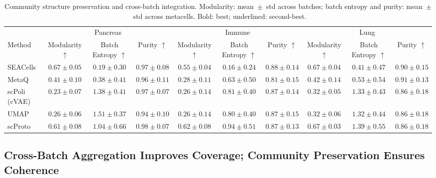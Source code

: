 \begin{table}[t]
\centering
\caption{Community structure preservation and cross-batch integration. Modularity: mean~$\pm$~std across batches; batch entropy and purity: mean~$\pm$~std across metacells. Bold: best; underlined: second-best.}
\label{tab:graph_batch}
\tiny
\setlength{\tabcolsep}{1pt}
\begin{tabular}{lccc|ccc|ccc}
\toprule
 & \multicolumn{3}{c}{Pancreas}
 & \multicolumn{3}{c}{Immune}
 & \multicolumn{3}{c}{Lung} \\
\cmidrule(lr){2-4} \cmidrule(lr){5-7} \cmidrule(lr){8-10}
Method
& Modularity $\uparrow$ & Batch Entropy $\uparrow$ & Purity $\uparrow$
& Modularity $\uparrow$ & Batch Entropy $\uparrow$ & Purity $\uparrow$
& Modularity $\uparrow$ & Batch Entropy $\uparrow$ & Purity $\uparrow$ \\
\midrule

SEACells
& $\mathbf{0.67 \pm 0.05}$ & $0.19 \pm 0.30$ & $\underline{0.97 \pm 0.08}$
& $\underline{0.55 \pm 0.04}$ & $0.16 \pm 0.24$ & $\mathbf{0.88 \pm 0.14}$
& $\mathbf{0.67 \pm 0.04}$ & $0.41 \pm 0.47$ & $\mathbf{0.90 \pm 0.15}$ \\

MetaQ
& $0.41 \pm 0.10$ & $0.38 \pm 0.41$ & $0.96 \pm 0.11$
& $0.28 \pm 0.11$ & $0.63 \pm 0.50$ & $0.81 \pm 0.15$
& $0.42 \pm 0.14$ & $0.53 \pm 0.54$ & $0.91 \pm 0.13$ \\

scPoli (cVAE)
& $0.23 \pm 0.07$ & $\underline{1.38 \pm 0.41}$ & $0.97 \pm 0.07$
& $0.26 \pm 0.14$ & $0.81 \pm 0.40$ & $0.87 \pm 0.14$
& $0.32 \pm 0.05$ & $\underline{1.33 \pm 0.43}$ & $0.86 \pm 0.18$ \\

UMAP
& $0.26 \pm 0.06$ & $\mathbf{1.51 \pm 0.37}$ & $0.94 \pm 0.10$
& $0.26 \pm 0.14$ & $0.80 \pm 0.40$ & $0.87 \pm 0.15$
& $0.32 \pm 0.06$ & $1.32 \pm 0.44$ & $0.86 \pm 0.18$ \\

\midrule

scProto
& $\underline{0.61 \pm 0.08}$ & $1.04 \pm 0.66$ & $\mathbf{0.98 \pm 0.07}$
& $\mathbf{0.62 \pm 0.08}$ & $\underline{0.94 \pm 0.51}$ & $0.87 \pm 0.13$
& $\mathbf{0.67 \pm 0.03}$ & $\mathbf{1.39 \pm 0.55}$ & $0.86 \pm 0.18$ \\

\bottomrule
\end{tabular}
\setlength{\tabcolsep}{6pt}
\end{table}

\subsection{Cross-Batch Aggregation Improves Coverage; Community Preservation Ensures Coherence}

